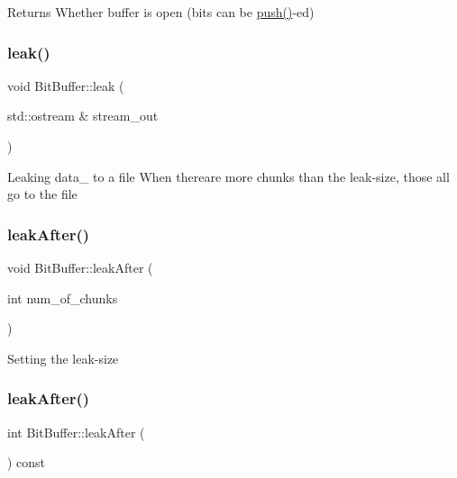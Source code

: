 \begin{DoxyReturn}{Returns}
Whether buffer is open (bits can be \hyperlink{class_bit_buffer_a1998d0bdd95e025f39e81671f5a20106}{push()}-\/ed) 
\end{DoxyReturn}
\mbox{\label{class_bit_buffer_a56d1e27a00a27e1ac95f2e03255081eb}} 
\subsubsection{\texorpdfstring{leak()}{leak()}}
{\footnotesize\ttfamily void Bit\+Buffer\+::leak (\begin{DoxyParamCaption}\item[{std\+::ostream \&}]{stream\+\_\+out }\end{DoxyParamCaption})}

Leaking data\+\_\+ to a file When there\textquotesingle{}are more chunks than the leak-\/size, those all go to the file \mbox{\label{class_bit_buffer_a10df48560dfbdd304a4e05a610379dc8}} 
\subsubsection{\texorpdfstring{leak\+After()}{leakAfter()}\hspace{0.1cm}{\footnotesize\ttfamily [1/2]}}
{\footnotesize\ttfamily void Bit\+Buffer\+::leak\+After (\begin{DoxyParamCaption}\item[{int}]{num\+\_\+of\+\_\+chunks }\end{DoxyParamCaption})}

Setting the leak-\/size \mbox{\label{class_bit_buffer_a28c31e06cd23a8ab3f7276bbb2c64b39}} 
\subsubsection{\texorpdfstring{leak\+After()}{leakAfter()}\hspace{0.1cm}{\footnotesize\ttfamily [2/2]}}
{\footnotesize\ttfamily int Bit\+Buffer\+::leak\+After (\begin{DoxyParamCaption}{ }\end{DoxyParamCaption}) const}

